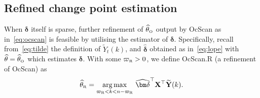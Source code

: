 \documentclass[11pt, a4paper]{article}
\newcommand{\mbf}{\mathbf}
\def\wh{\widehat}
\def\wt{\widetilde}
\newcommand{\cp}{\theta}
\newcommand{\Oc}{\text{\tiny \upshape O}} %
\newcommand{\Rf}{\text{\tiny \upshape R}} %
\theoremstyle{definition}
\theoremstyle{definition}
\theoremstyle{definition}
\theoremstyle{definition}
\theoremstyle{definition}
\theoremstyle{remark}
\theoremstyle{definition}
\theoremstyle{definition}
\theoremstyle{definition}
\begin{document}
\subsection{Refined change point estimation}
\label{sec:refine}

When $\bm\delta$ itself is sparse, further refinement of $\wh\cp_{\Oc}$ output by OcScan as in~\eqref{eq:ocscan} is feasible by utilising the estimator of $\bm\delta$.
Specifically, recall from~\eqref{eq:tilde} the definition of $\wt{Y}_t(k)$, and $\wh{\bm\delta}$ obtained as in~\eqref{eq:lope} with $\wh\cp = \wh\cp_{\Oc}$ which estimates $\bm\delta$.
With some $\varpi_{\Rf} > 0$, we define OcScan.R (a refinement of OcScan)  as
\begin{align*}
\wh{\cp}_{\Rf} = \mathop{\arg\max}_{\varpi_{\Rf} < k < n - \varpi_{\Rf}} \, \wh{\bm\delta}^\top \mbf X^\top \wt{\mbf Y}(k).
\end{align*}
\end{document}

